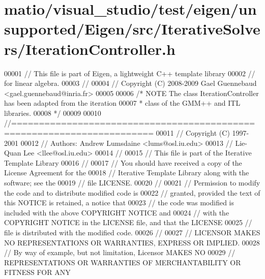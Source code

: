 \hypertarget{matio_2visual__studio_2test_2eigen_2unsupported_2_eigen_2src_2_iterative_solvers_2_iteration_controller_8h_source}{}\section{matio/visual\+\_\+studio/test/eigen/unsupported/\+Eigen/src/\+Iterative\+Solvers/\+Iteration\+Controller.h}
\label{matio_2visual__studio_2test_2eigen_2unsupported_2_eigen_2src_2_iterative_solvers_2_iteration_controller_8h_source}

\begin{DoxyCode}
00001 \textcolor{comment}{// This file is part of Eigen, a lightweight C++ template library}
00002 \textcolor{comment}{// for linear algebra.}
00003 \textcolor{comment}{//}
00004 \textcolor{comment}{// Copyright (C) 2008-2009 Gael Guennebaud <gael.guennebaud@inria.fr>}
00005 
00006 \textcolor{comment}{/* NOTE The class IterationController has been adapted from the iteration}
00007 \textcolor{comment}{ *      class of the GMM++ and ITL libraries.}
00008 \textcolor{comment}{ */}
00009 
00010 \textcolor{comment}{//=======================================================================}
00011 \textcolor{comment}{// Copyright (C) 1997-2001}
00012 \textcolor{comment}{// Authors: Andrew Lumsdaine <lums@osl.iu.edu> }
00013 \textcolor{comment}{//          Lie-Quan Lee     <llee@osl.iu.edu>}
00014 \textcolor{comment}{//}
00015 \textcolor{comment}{// This file is part of the Iterative Template Library}
00016 \textcolor{comment}{//}
00017 \textcolor{comment}{// You should have received a copy of the License Agreement for the}
00018 \textcolor{comment}{// Iterative Template Library along with the software;  see the}
00019 \textcolor{comment}{// file LICENSE.  }
00020 \textcolor{comment}{//}
00021 \textcolor{comment}{// Permission to modify the code and to distribute modified code is}
00022 \textcolor{comment}{// granted, provided the text of this NOTICE is retained, a notice that}
00023 \textcolor{comment}{// the code was modified is included with the above COPYRIGHT NOTICE and}
00024 \textcolor{comment}{// with the COPYRIGHT NOTICE in the LICENSE file, and that the LICENSE}
00025 \textcolor{comment}{// file is distributed with the modified code.}
00026 \textcolor{comment}{//}
00027 \textcolor{comment}{// LICENSOR MAKES NO REPRESENTATIONS OR WARRANTIES, EXPRESS OR IMPLIED.}
00028 \textcolor{comment}{// By way of example, but not limitation, Licensor MAKES NO}
00029 \textcolor{comment}{// REPRESENTATIONS OR WARRANTIES OF MERCHANTABILITY OR FITNESS FOR ANY}

\end{DoxyCode}
